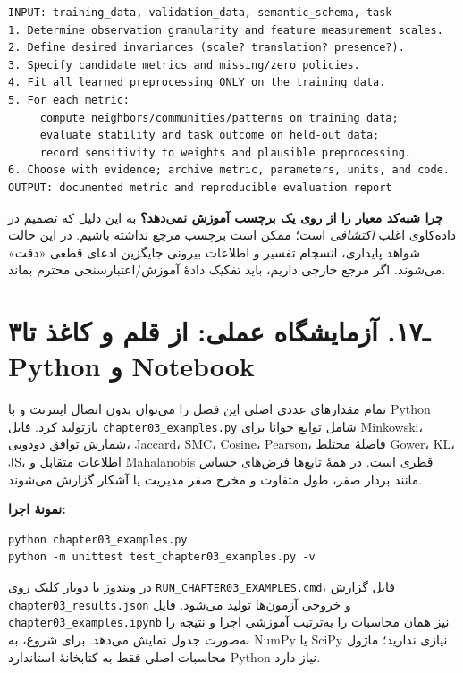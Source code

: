 \documentclass[12pt,a4paper,oneside]{book}
\begin{document}
\begin{verbatim}
INPUT: training_data, validation_data, semantic_schema, task
1. Determine observation granularity and feature measurement scales.
2. Define desired invariances (scale? translation? presence?).
3. Specify candidate metrics and missing/zero policies.
4. Fit all learned preprocessing ONLY on the training data.
5. For each metric:
     compute neighbors/communities/patterns on training data;
     evaluate stability and task outcome on held-out data;
     record sensitivity to weights and plausible preprocessing.
6. Choose with evidence; archive metric, parameters, units, and code.
OUTPUT: documented metric and reproducible evaluation report
\end{verbatim}

\textbf{چرا شبه‌کد معیار را از روی یک برچسب آموزش نمی‌دهد؟} به این دلیل که تصمیم در داده‌کاوی اغلب \emph{اکتشافی} است؛ ممکن است برچسب مرجع نداشته باشیم. در این حالت شواهد پایداری، انسجام تفسیر و اطلاعات بیرونی جایگزین ادعای قطعی «دقت» می‌شوند. اگر مرجع خارجی داریم، باید تفکیک دادهٔ آموزش/اعتبارسنجی محترم بماند.

\section{۳ـ۱۷. آزمایشگاه عملی: از قلم و کاغذ تا Python و Notebook}\label{ux640ux6f1ux6f7.-ux622ux632ux645ux627ux6ccux634ux6afux627ux647-ux639ux645ux644ux6cc-ux627ux632-ux642ux644ux645-ux648-ux6a9ux627ux63aux630-ux62aux627-python-ux648-notebook}

تمام مقدارهای عددی اصلی این فصل را می‌توان بدون اتصال اینترنت و با Python بازتولید کرد. فایل \texttt{chapter03\_examples.py} شامل توابع خوانا برای Minkowski، شمارش توافق دودویی، Jaccard، SMC، Cosine، Pearson، فاصلهٔ مختلط Gower، KL، JS، اطلاعات متقابل و Mahalanobis قطری است. در همهٔ تابع‌ها فرض‌های حساس مانند بردار صفر، طول متفاوت و مخرج صفر مدیریت یا آشکار گزارش می‌شوند.

\textbf{نمونهٔ اجرا:}

\begin{verbatim}
python chapter03_examples.py
python -m unittest test_chapter03_examples.py -v
\end{verbatim}

در ویندوز با دوبار کلیک روی \texttt{RUN\_CHAPTER03\_EXAMPLES.cmd}، فایل گزارش \texttt{chapter03\_results.json} و خروجی آزمون‌ها تولید می‌شود. فایل \texttt{chapter03\_examples.ipynb} نیز همان محاسبات را به‌ترتیب آموزشی اجرا و نتیجه را به‌صورت جدول نمایش می‌دهد. برای شروع، به NumPy یا SciPy نیازی ندارید؛ ماژول محاسبات اصلی فقط به کتابخانهٔ استاندارد Python نیاز دارد.
\end{document}
